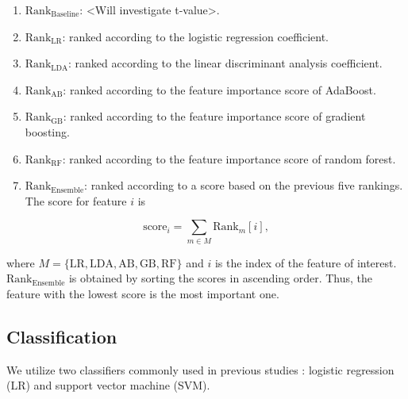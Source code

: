 \documentclass[pdflatex,sn-mathphys]{sn-jnl}%
\theoremstyle{thmstyleone}%
\theoremstyle{thmstyletwo}%
\theoremstyle{thmstylethree}%
\begin{document}

\begin{enumerate}
    \item $\text{Rank}_{\text{Baseline}}$: <Will investigate t-value>.
    \item $\text{Rank}_{\text{LR}}$: ranked according to the logistic regression coefficient.
    \item $\text{Rank}_{\text{LDA}}$: ranked according to the linear discriminant analysis coefficient.
    \item $\text{Rank}_{\text{AB}}$: ranked according to the feature importance score of AdaBoost.
    \item $\text{Rank}_{\text{GB}}$: ranked according to the feature importance score of gradient boosting.
    \item $\text{Rank}_{\text{RF}}$: ranked according to the feature importance score of random forest.
    \item $\text{Rank}_{\text{Ensemble}}$: ranked according to a score based on the previous five rankings. The score for feature $i$ is
\end{enumerate}

\begin{equation} \label{eq:rank_score}
   \text{score}_i = \sum_{m\in M} \text{Rank}_{m}[i],
\end{equation}

where $M = \{\text{LR}, \text{LDA}, \text{AB}, \text{GB}, \text{RF} \}$ and $i$ is the index of the feature of interest. $\text{Rank}_{\text{Ensemble}}$ is obtained by sorting the scores in ascending order. Thus, the feature with the lowest score is the most important one.

\subsection{Classification}\label{subsec4}
We utilize two classifiers commonly used in previous studies \cite{Alshargie-2018, Subhani-2017, Saeed2020, Kotsiantis2007}: logistic regression (LR) and support vector machine (SVM).

\end{document}
